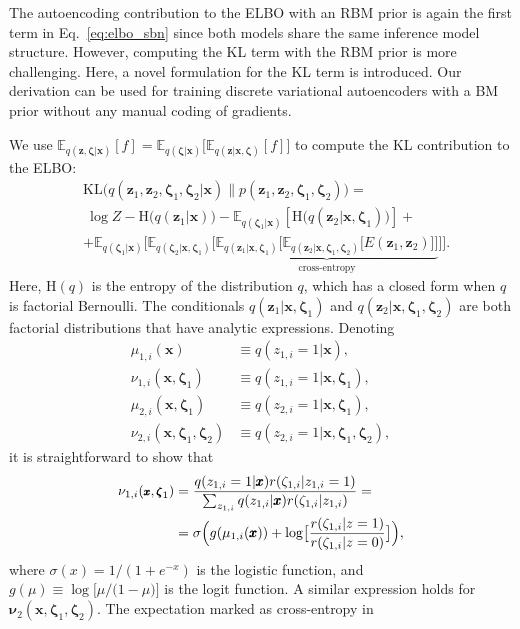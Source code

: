 \documentclass{article}
\newcommand{\x}{{\pmb{x}}}
\newcommand{\z}{{\pmb{z}}}
\newcommand{\bzeta}{{\pmb{\zeta}}}
\newcommand{\bnu}{{\pmb{\nu}}}
\newcommand{\E}{{\mathbb{E}}}
\def\KL{\text{KL}}
\def\H{\text{H}}
\begin{document}
The autoencoding contribution to the ELBO with an RBM prior is again the first term in Eq.~\eqref{eq:elbo_sbn} since both models share the same inference model structure. However, computing the KL term with the RBM prior is more challenging. Here, a novel formulation for the KL term is introduced. Our derivation can be used for training discrete variational autoencoders with a BM prior without any manual coding of gradients.

We use $\E_{q(\z, \bzeta|\x)}[f] = \E_{q(\bzeta|\x)}\bigl[\E_{q(\z|\x, \bzeta)}[f]\bigr]$ to compute the KL contribution to the ELBO:
{\small
\begin{align}
 &\KL\bigl(q(\z_1, \z_2, \bzeta_1, \bzeta_2 | \x) \| p(\z_1, \z_2, \bzeta_1, \bzeta_2)\bigr) = \nonumber \\
 & \ \log Z -\H\bigl(q(\z_1|\x)\bigr) - \E_{q(\bzeta_1|\x)} \left[\H\bigl(q(\z_2|\x, \bzeta_1)\bigr)\right] + \label{eq:kl_simple} \\
 & +\E_{q(\bzeta_1|\x)}\!\big[\E_{q(\bzeta_2|\x, \bzeta_1)}\!\big[\underbrace{\E_{q(\z_1|\x, \bzeta_1)}\!\big[
 \E_{q(\z_2|\x, \bzeta_1, \bzeta_2)}\!\big[ E(\z_1, \z_2) \big]\big]}_{\text{cross-entropy}}\big]\big]. \nonumber
\end{align}}
Here, $\H(q)$ is the entropy of the distribution $q$, which has a closed form when $q$ is factorial Bernoulli. The conditionals $q(\z_1|\x, \bzeta_1)$ and $q(\z_2|\x, \bzeta_1, \bzeta_2)$ are both
factorial distributions that have analytic expressions. Denoting 
\begin{align*}
\mu_{1,i}(\x) &\equiv q(z_{1,i}=1|\x),  \\
\nu_{1,i}(\x, \bzeta_1) &\equiv q(z_{1,i}=1|\x, \bzeta_1), \\
\mu_{2,i}(\x, \bzeta_1) &\equiv q(z_{2,i}=1|\x, \bzeta_1), \\
\nu_{2,i}(\x, \bzeta_1, \bzeta_2) &\equiv q(z_{2,i}=1|\x, \bzeta_1, \bzeta_2),
\end{align*}
it is straightforward to show that 
\begin{align*}
\footnotesize
    \nu_{1, i}(\x, \bzeta_1) &= \frac{q(z_{1,i}=1|\x) r(\zeta_{1, i}|z_{1, i}=1)}{\sum_{z_{1,i}}q(z_{1,i}|\x) r(\zeta_{1, i}|z_{1, i})} = \\
    &= \sigma\Bigl(g(\mu_{1,i}(\x)) + \log\bigl[\frac{r(\zeta_{1, i}|z=1)}{r(\zeta_{1, i}|z=0)}\bigr]\Bigr),
\end{align*}
where $\sigma(x)=1/(1+e^{-x})$ is the logistic function, and $g(\mu) \equiv \log \bigl[\mu/\bigl(1 - \mu\bigr)\bigr]$ is the logit function. A similar expression holds for $\bnu_2(\x, \bzeta_1, \bzeta_2)$. The expectation marked as cross-entropy in 
\end{document}
